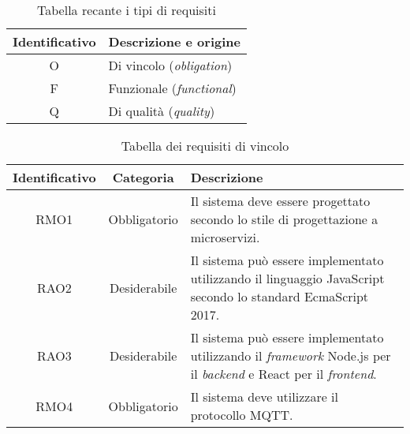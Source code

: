 \begin{table}[H]
\caption{Tabella recante i tipi di requisiti}
\label{tab:tipi-requisiti}
\begin{tabularx}{\linewidth}{|c|X|}
\hline
\textbf{Identificativo} & \textbf{Descrizione e origine} \\
\hline
O & Di vincolo (\emph{obligation}) \\
\hline
F & Funzionale (\emph{functional}) \\
\hline
Q & Di qualità (\emph{quality}) \\
\hline
\end{tabularx}
\end{table}



\begin{table}[H]
\caption{Tabella dei requisiti di vincolo}
\label{tab:requisiti-vincolo}
\begin{tabularx}{\linewidth}{|c|c|X|}
\hline
\textbf{Identificativo} & \textbf{Categoria} & \textbf{Descrizione} \\
\hline
RMO1 & Obbligatorio & Il sistema deve essere progettato secondo lo stile di progettazione a microservizi. \\
\hline
RAO2 & Desiderabile & Il sistema può essere implementato utilizzando il linguaggio JavaScript secondo lo standard EcmaScript 2017. \\
\hline
RAO3 & Desiderabile & Il sistema può essere implementato utilizzando il \emph{framework} Node.js per il \emph{backend} e React per il \emph{frontend}. \\
\hline
RMO4 & Obbligatorio & Il sistema deve utilizzare il protocollo MQTT. \\
\hline
\end{tabularx}
\end{table}


